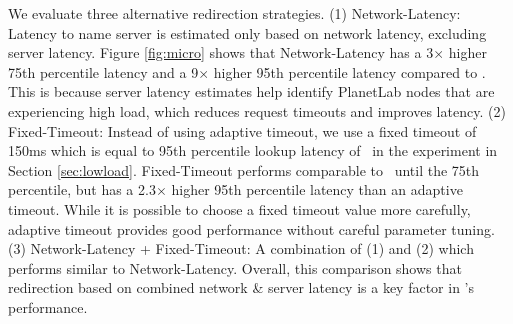 We evaluate three  alternative redirection strategies. 
(1)  \textsf{Network-Latency}:  Latency to name server is estimated  only based on network latency, excluding server latency. Figure \ref{fig:micro} shows that  \textsf{Network-Latency}  has a 3$\times$ higher 75th percentile latency and a 9$\times$ higher 95th percentile latency compared to \auspice. This is because server latency estimates  help identify PlanetLab nodes that are experiencing high load, which reduces request timeouts and improves latency. 
(2)  \textsf{Fixed-Timeout}: Instead of using adaptive timeout, we use a fixed timeout of 150ms which is equal to 95th percentile lookup latency of \auspice\ in the experiment in Section \ref{sec:lowload}. \textsf{Fixed-Timeout} performs comparable to \auspice\ until the 75th percentile, but has a 2.3$\times$ higher 95th percentile latency than an adaptive timeout. While it is possible to choose a fixed timeout value more carefully, adaptive timeout provides good performance without careful parameter tuning.
(3) \textsf{Network-Latency + Fixed-Timeout}: A combination of (1) and (2) which performs similar to \textsf{Network-Latency}. 
Overall, this comparison shows that redirection based on combined network  \& server latency is a key factor in \auspice's performance.



